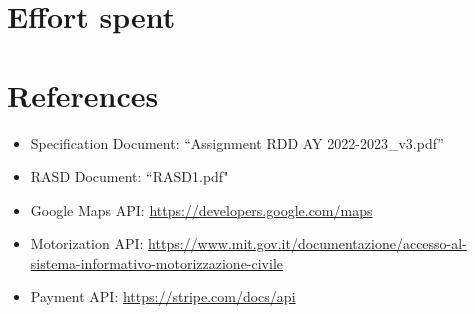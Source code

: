 \documentclass[a4paper]{report}
\begin{document}
\chapter{Effort spent}

\chapter{References}
\begin{itemize}
\item Specification Document: “Assignment RDD AY 2022-2023\_v3.pdf”
\item RASD Document: “RASD1.pdf"
\item Google Maps API: \href{https://developers.google.com/maps}{https://developers.google.com/maps}
\item Motorization API: \href{https://www.mit.gov.it/documentazione/accesso-al-sistema-informativo-motorizzazione-civile}{https://www.mit.gov.it/documentazione/accesso-al-sistema-informativo-motorizzazione-civile}
\item Payment API: \href{https://stripe.com/docs/api}{https://stripe.com/docs/api}
\end{itemize}
\end{document}
